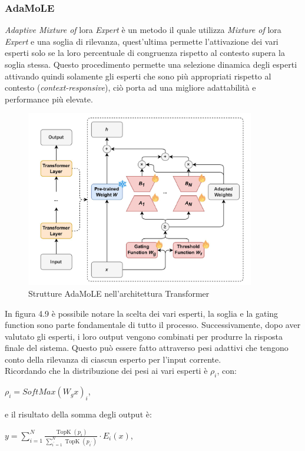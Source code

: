         \subsubsection{AdaMoLE}
        \textit{Adaptive Mixture of} \gls{lora} \textit{Expert} è un metodo il quale utilizza \textit{Mixture of} \gls{lora} \textit{Expert} e una soglia di rilevanza, quest’ultima permette l’attivazione dei vari esperti solo se la loro percentuale di congruenza rispetto al contesto supera la soglia stessa.
        Questo procedimento permette una selezione dinamica degli   esperti attivando quindi solamente gli esperti che sono più appropriati rispetto al contesto (\textit{context-responsive}), ciò porta ad una migliore adattabilità e performance più elevate.
        \begin{figure}[htp]
            \centering        
            \includegraphics[width=10cm]{img/AdaMOle.pdf}
            \caption{Strutture AdaMoLE nell'architettura Transformer}
        \end{figure}\newline
        In figura 4.9 è possibile notare la scelta dei vari esperti, la soglia e la gating function sono parte fondamentale di tutto il processo.
        Successivamente, dopo aver valutato gli esperti, i loro output vengono combinati per produrre la risposta finale del sistema. Questo può essere fatto attraverso pesi adattivi che tengono conto della rilevanza di ciascun esperto per l'input corrente.\\
        Ricordando che la distribuzione dei pesi ai vari esperti è $\rho_i$, con:\\
        \centerline{$\rho_i = SoftMax(W_gx)_i$,}
        e il risultato della somma degli output è:\\
        \centerline{$y=\sum_{i=1}^N \frac{\operatorname{TopK}\left(p_i\right)}{\sum_{i^{\prime}=1}^N \operatorname{TopK}\left(p_{i^{\prime}}\right)} \cdot E_i(x)$,}
